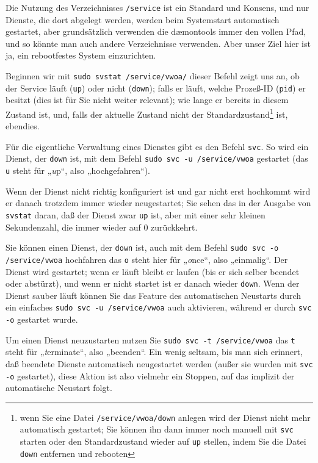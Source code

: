 Die Nutzung des Verzeichnisses \texttt{/service} ist ein Standard und
Konsens, und nur Dienste, die dort abgelegt werden, werden beim Systemstart
automatisch gestartet, aber grundsätzlich verwenden die dæmontools immer
den vollen Pfad, und so könnte man auch andere Verzeichnisse verwenden.
Aber unser Ziel hier ist ja, ein rebootfestes System einzurichten.

Beginnen wir mit \texttt{sudo svstat /service/vwoa/} \dash dieser Befehl
zeigt uns an, ob der Service läuft (\texttt{up}) oder nicht (\texttt{down});
falls er läuft, welche Prozeß-ID (\texttt{pid}) er besitzt (dies ist für
Sie nicht weiter relevant); wie lange er bereits in diesem Zustand ist,
und, falls der aktuelle Zustand nicht der Standardzustand\Hair\footnote
{wenn Sie eine Datei \texttt{/service/vwoa/down} anlegen wird der Dienst
nicht mehr automatisch gestartet; Sie können ihn dann immer noch manuell
mit \texttt{svc} starten oder den Standardzustand wieder auf \texttt{up}
stellen, indem Sie die Datei \texttt{down} entfernen und rebooten} ist,
ebendies.

Für die eigentliche Verwaltung eines Dienstes gibt es den Befehl
\texttt{svc}. So wird ein Dienst, der \texttt{down} ist, mit dem Befehl
\texttt{sudo svc -u /service/vwoa} gestartet (das \texttt{u} steht für
„\emph{u}p“, also „hochgefahren“).

Wenn der Dienst nicht richtig konfiguriert ist und gar nicht erst hochkommt
wird er danach trotzdem immer wieder neugestartet; Sie sehen das in der
Ausgabe von \texttt{svstat} daran, daß der Dienst zwar \texttt{up} ist,
aber mit einer sehr kleinen Sekundenzahl, die immer wieder auf 0 zurückkehrt.

Sie können einen Dienst, der \texttt{down} ist, auch mit dem Befehl
\texttt{sudo svc -o /service/vwoa} hochfahren \dash das \texttt{o} steht
hier für „\emph{o}nce“, also „einmalig“. Der Dienst wird gestartet; wenn
er läuft bleibt er laufen (bis er sich selber beendet oder abstürzt), und
wenn er nicht startet ist er danach wieder \texttt{down}. Wenn der Dienst
sauber läuft können Sie das Feature des automatischen Neustarts durch ein
einfaches \texttt{sudo svc -u /service/vwoa} auch aktivieren, während er
durch \texttt{svc -o} gestartet wurde.

Um einen Dienst neuzustarten nutzen Sie \texttt{sudo svc -t /service/vwoa}
\dash das \texttt{t} steht für „\emph{t}erminate“, also „beenden“. Ein wenig
seltsam, bis man sich erinnert, daß beendete Dienste automatisch neugestartet
werden (außer sie wurden mit \texttt{svc -o} gestartet), diese Aktion ist
also vielmehr ein Stoppen, auf das implizit der automatische Neustart folgt.

